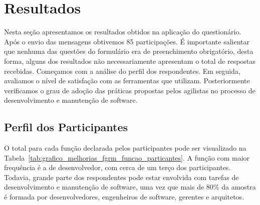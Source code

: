 \section{Resultados}\label{sec:analise_dados}

Nesta seção apresentamos os resultados obtidos na aplicação do questionário.
Após o envio das mensagens obtivemos 85 participações. É importante salientar
que nenhuma das questões do formulário era de preenchimento obrigatório, desta
forma, alguns dos resultados não necessariamente apresentam o total de
respostas recebidas. Começamos com a análise do perfil dos respondentes. Em
seguida, avaliamos o nível de satisfação com as ferramentas que utilizam.
Posteriormente verificamos o grau de adoção das práticas propostas pelos
agilistas no processo de desenvolvimento e manutenção de software.

\subsection{Perfil dos Participantes}\label{sub:pesquisa_prof_perfil_dos_participantes}

O total para cada função declarada pelos participantes pode ser visualizado na
Tabela~\ref{tab:grafico_melhorias_fgrm_funcao_particantes}. A função com maior
frequência é a de desenvolvedor, com cerca de um terço dos participantes.
Todavia, grande parte dos respondentes pode estar envolvida com tarefas de
desenvolvimento e manutenção de software, uma vez que mais de 80\% da amostra é
formada por desenvolvedores, engenheiros de software, gerentes e arquitetos.

\begin{table}[htpb]
\centering
{}
\caption{Função desempenhada pelos participantes}\label{tab:grafico_melhorias_fgrm_funcao_particantes}
\end{table}

